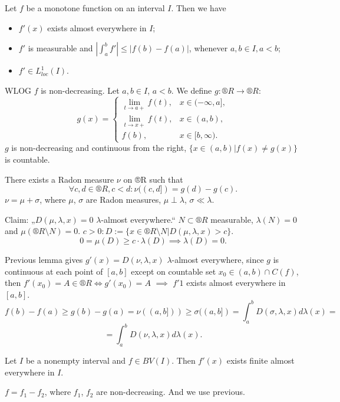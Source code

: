 \documentclass[12pt]{article}					%
\begin{document}
\begin{veta}[Lebesgue]
	Let $f$ be a monotone function on an interval $I$. Then we have

	\begin{itemize}
		\item $f'(x)$ exists almost everywhere in $I$;
		\item $f'$ is measurable and $|\int_a^b f'| ≤ |f(b) - f(a)|$, whenever $a, b \in I, a < b$;
		\item $f' \in L_{loc}^1(I)$.
	\end{itemize}

	\begin{dukazin}
		WLOG $f$ is non-decreasing. Let $a, b \in I$, $a < b$. We define $g: ®R \rightarrow ®R$:
		$$ g(x) = \begin{cases}\lim_{t \rightarrow a+} f(t), & x \in (-∞, a],\\ \lim_{t \rightarrow x+} f(t), & x \in (a, b),\\ f(b), & x \in [b, ∞).\end{cases} $$
		$g$ is non-decreasing and continuous from the right, $\{x \in (a, b) | f(x) ≠ g(x)\}$ is countable.

		There exists a Radon measure $\nu$ on ®R such that
		$$ \forall c, d \in ®R, c < d: \nu((c, d]) = g(d) - g(c). $$
		$\nu = \mu + \sigma$, where $\mu$, $\sigma$ are Radon measures, $\mu \perp \lambda$, $\sigma \ll \lambda$.

		Claim: „$D(\mu, \lambda, x) = 0$ $\lambda$-almost everywhere.“ $N \subset ®R$ measurable, $\lambda(N) = 0$ and $\mu(®R \setminus N) = 0$. $c > 0: D:= \{x \in ®R \setminus N | D(\mu, \lambda, x) > c\}$.
		$$ 0 = \mu(D) ≥ c·\lambda(D) \implies \lambda(D) = 0. $$

		Previous lemma gives $g'(x) = D(\nu, \lambda, x)$ $\lambda$-almost everywhere, since $g$ is continuous at each point of $[a, b]$ except on countable set $x_0 \in (a, b) \cap C(f)$, then $f'(x_0) = A \in ®R \Leftrightarrow g'(x_0) = A$ $\implies$ $f'1$ exists almost everywhere in $[a, b]$.
		$$ f(b) - f(a) ≥ g(b) - g(a) = \nu((a, b])) ≥ \sigma((a, b]) = \int_a^b D(\sigma, \lambda, x) d\lambda(x) = $$
		$$ = \int_a^b D(\nu, \lambda, x) d\lambda(x). $$
	\end{dukazin}
\end{veta}

\begin{veta}
	Let $I$ be a nonempty interval and $f \in BV(I)$. Then $f'(x)$ exists finite almost everywhere in $I$.

	\begin{dukazin}
		$f = f_1 - f_2$, where $f_1$, $f_2$ are non-decreasing. And we use previous.
	\end{dukazin}
\end{veta}
\end{document}
